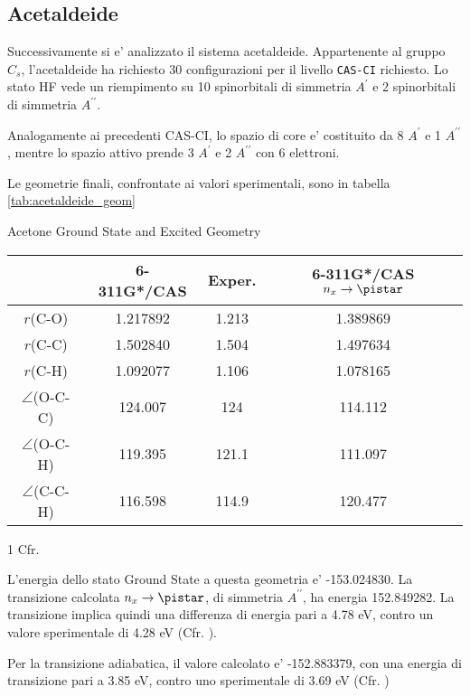 \subsection{Acetaldeide}

Successivamente si e' analizzato il sistema acetaldeide. Appartenente al gruppo
$C_s$, l'acetaldeide ha richiesto 30 configurazioni per il livello \texttt{CAS-CI}
richiesto. Lo stato HF vede un riempimento su 10 spinorbitali di simmetria 
$A^\prime$ e 2 spinorbitali di simmetria $A^{\prime\prime}$.

Analogamente ai precedenti CAS-CI, lo spazio di core e' costituito da
8 $A^\prime$ e 1 $A^{\prime\prime}$, mentre lo spazio attivo prende 3 $A^\prime$ e
2 $A^{\prime\prime}$ con 6 elettroni.

Le geometrie finali, confrontate ai valori sperimentali, sono in tabella \ref{tab:acetaldeide_geom}
\begin{center}
\begin{threeparttable}
\caption{Acetone Ground State and Excited Geometry}
\label{tab:acetaldeide_geom}
\small
\begin{tabular}{|cccc|}
\hline
							& 6-311G*/CAS	& Exper.\tnote{1} & 6-311G*/CAS $n_x \rightarrow \pistar$ \\
\hline
$r$(C-O)					& 1.217892		& 1.213 	& 1.389869 \\
$r$(C-C)					& 1.502840		& 1.504		& 1.497634 \\	
$r$(C-H)					& 1.092077		& 1.106		& 1.078165 \\	
$\angle$(O-C-C)				& 124.007		& 124		& 114.112 \\	
$\angle$(O-C-H)				& 119.395		& 121.1		& 111.097 \\	
$\angle$(C-C-H)				& 116.598		& 114.9		& 120.477 \\	
\hline
\end{tabular}
\begin{tablenotes}
\tiny
 \item[1] Cfr. \cite{jms-550-551-2000-281}
\end{tablenotes}
\end{threeparttable}
\end{center}

L'energia dello stato Ground State a questa geometria e' -153.024830.
La transizione calcolata $n_x \rightarrow \pistar$, di simmetria $A^{\prime\prime}$,
ha energia 152.849282. La transizione implica quindi una differenza di energia pari
a 4.78 eV, contro un valore sperimentale di 4.28 eV (Cfr. \cite{cpl-241-0-1995-26}).

Per la transizione adiabatica, il valore calcolato e' -152.883379, con una energia
di transizione pari a 3.85 eV, contro uno sperimentale di 3.69 eV (Cfr. \cite{jpc-97-17-1993-4293})

